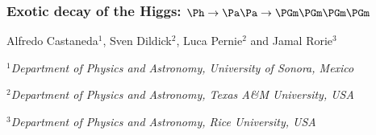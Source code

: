 \subsubsection{Exotic decay of the Higgs: $\Ph\to\Pa\Pa\to\PGm\PGm\PGm\PGm$}
\label{subsec:fourmu}

\begin{center}
 {Alfredo Castaneda$^{1}$, Sven Dildick$^{2}$, Luca Pernie$^{2}$ and Jamal Rorie$^{3}$ \\
}
\centerline{{\it  $^{1}$Department of Physics and Astronomy, University of Sonora, Mexico}}
\centerline{{\it $^{2}$Department of Physics and Astronomy, Texas A\&M University, USA}}
\centerline{{\it  $^{3}$Department of Physics and Astronomy, Rice University, USA}}
\end{center}

\newcommand{\processbbtt}{\ensuremath{{\Ph}\to{\Pa\Pa}\to2\Pgt2{\cPqb}}\xspace}
\newcommand{\processmmtt}{\ensuremath{{\Ph}\to{\Pa\Pa}\to2\Pgm2{\Pgt}}\xspace}
\newcommand{\ma}{\ensuremath{m_{\Pa}}\xspace}
\newcommand{\mbtt}{\ensuremath{m_{\cPqb\Pgt\Pgt}^{\text{vis}}}\xspace}


\newcommand{\PX}{\ensuremath{\mathrm{X}}\xspace}
\newcommand{\gammaDark}{\ensuremath{{\PGg}_{\mathrm{D}}}\xspace}
\newcommand{\nOne}{\ensuremath{\textnormal{n}_{1}}\xspace}
\newcommand{\nDark}{\ensuremath{\textnormal{n}_{\mathrm{D}}}\xspace}
\newcommand{\PhOne}{\ensuremath{\Ph_{1}}\xspace}
\newcommand{\PhTwo}{\ensuremath{\Ph_{2}}\xspace}
\newcommand{\PhOneTwo}{\ensuremath{\Ph_{1,2}}\xspace}
\newcommand{\PaOne}{\ensuremath{\Pa_{1}}\xspace}
\newcommand{\dimuon}{\ensuremath{(\PGm\PGm)}\xspace}
\newcommand{\dimuonOne}{\ensuremath{(\PGm\PGm)_1}\xspace}
\newcommand{\dimuonTwo}{\ensuremath{(\PGm\PGm)_2}\xspace}

\newcommand{\MgammaDark}{\ensuremath{m_{{\PGg}_{\mathrm{D}}}}\xspace}
\newcommand{\MnOne}{\ensuremath{m_{{\textnormal{n}}_{1}}}\xspace}
\newcommand{\MnDark}{\ensuremath{m_{{\textnormal{n}}_{\mathrm{D}}}}\xspace}
\newcommand{\MPhOne}{\ensuremath{m_{\Ph_{1}}}\xspace}
\newcommand{\MPhTwo}{\ensuremath{m_{\Ph_{2}}}\xspace}
\newcommand{\MPhOneTwo}{\ensuremath{m_{\Ph_{1,2}}}\xspace}
\newcommand{\MPhI}{\ensuremath{m_{\Ph_{i}}}\xspace}
\newcommand{\MPa}{\ensuremath{m_{\Pa}}\xspace}
\newcommand{\MPaOne}{\ensuremath{m_{\Pa_{1}}}\xspace}
\newcommand{\Mdimuon}{\ensuremath{m_{(\PGm\PGm)}}\xspace}
\newcommand{\MdimuonOne}{\ensuremath{m_{(\PGm\PGm)_1}}\xspace}
\newcommand{\MdimuonTwo}{\ensuremath{m_{(\PGm\PGm)_2}}\xspace}
\newcommand{\Mmuon}{\ensuremath{m_{\PGm}}\xspace}

